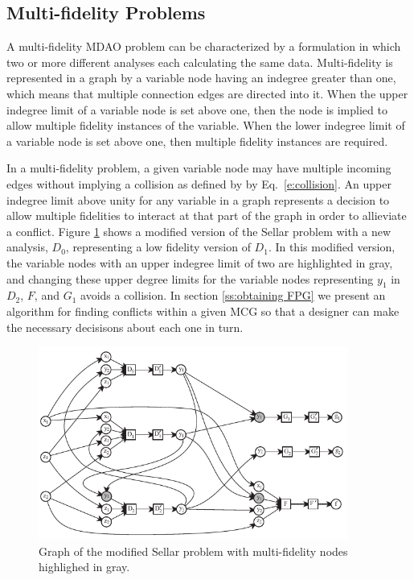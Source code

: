 \subsection{Multi-fidelity Problems}
  \label{ss:multi-fideliy problems}
  A multi-fidelity MDAO problem can be characterized by a formulation in which 
  two or more different analyses each calculating the same data. Multi-fidelity 
  is represented in a graph by a variable node having an indegree greater than 
  one, which means that multiple connection edges are directed into it. When the 
  upper indegree limit of a variable node is set above one, then the node is 
  implied to allow multiple fidelity instances of the variable. When the lower 
  indegree limit of a variable node is set above one, then multiple fidelity instances are required.

  In a multi-fidelity problem, a given variable node may have multiple incoming 
  edges without implying a collision as defined by by Eq.~\ref{e:collision}. 
An  upper indegree limit above unity for any variable in a graph represents a decision to 
  allow multiple fidelities to interact at that part of the graph in order to allieviate
  a conflict. 
  Figure \ref{f:collision_example} shows a modified version of the Sellar problem 
  with a new analysis, $D_0$, representing a low fidelity version of $D_1$. 
  In this modified version, the variable nodes with an upper indegree limit of two are highlighted in gray, and changing these upper degree limits for the variable nodes representing $y_1$ in $D_2$, $F$, and $G_1$ avoids a collision.
In section \ref{ss:obtaining FPG} we present an algorithm for finding 
  conflicts within a given MCG so that a designer can make the necessary decisisons about each 
  one in turn. 
  \begin{figure}
    \begin{center}
      \includegraphics[width=4in]{images/sellar_mulfi}
    \caption{Graph of the modified Sellar problem with multi-fidelity nodes highlighed in gray.\label{f:collision_example}}
  \end{center}
  \end{figure}

